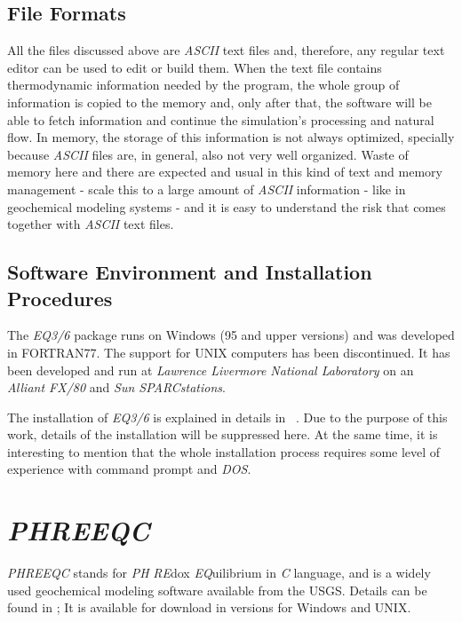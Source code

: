 \subsection{File Formats}
All the files discussed above are \emph{ASCII} text files and, therefore, any regular text editor can be used to edit or build them. When the text file contains thermodynamic information needed by the program, the whole group of information is copied to the memory and, only after that, the software will be able to fetch information and continue the simulation's processing and natural flow. In memory, the storage of this information is not always optimized, specially because \emph{ASCII} files are, in general, also not very well organized. Waste of memory here and there are expected and usual in this kind of text and memory management - scale this to a large amount of \emph{ASCII} information - like in geochemical modeling systems - and it is easy to understand the risk that comes together with \emph{ASCII} text files. 

\subsection{Software Environment and Installation Procedures}
The \emph{EQ3/6} package runs on Windows (95 and upper versions) and was developed in FORTRAN77. The support for UNIX computers has been discontinued.  It has been developed and run at \emph{Lawrence Livermore National Laboratory} on an \emph{Alliant FX/80} and \emph{Sun SPARCstations}.

The installation of \emph{EQ3/6} is explained in details in ~\cite{Wolery:1992}. Due to the purpose of this work, details of the installation will be suppressed here.
At the same time, it is interesting to mention that the whole installation process requires some level of experience with command prompt and \emph{DOS}.



\section{\emph{PHREEQC}}
\emph{PHREEQC} stands for \emph{PH} \emph{RE}dox \emph{EQ}uilibrium in \emph{C} language, and is a widely used geochemical modeling software available from the USGS. Details can be found in \cite{Parkhurst:95};
It is available for download in versions for Windows and UNIX. 

